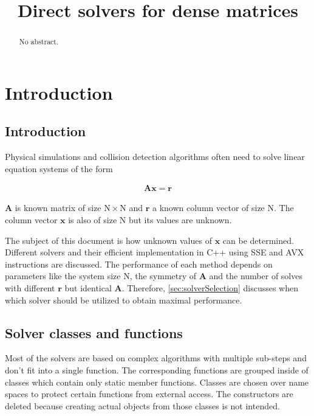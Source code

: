 \documentclass[fontsize = 10pt,DIV = 13]{scrartcl}
\title{Direct solvers for dense matrices}
\begin{document}
\maketitle

\begin{abstract}
No abstract.
\end{abstract}
\newpage
\tableofcontents
\newpage

\section{Introduction}

\subsection{Introduction}
Physical simulations and collision detection algorithms often need to solve linear equation systems of the form

\begin{align}
\label{eq:linearSystem}
\mathbf{A}\mathbf{x}=\mathbf{r}
\end{align}

$\mathbf{A}$ is known matrix of size $\mathrm{N}\times\mathrm{N}$ and $\mathbf{r}$ a known column vector of size $\mathrm{N}$.
The column vector $\mathbf{x}$ is also of size $\mathrm{N}$ but its values are unknown.

 


The subject of this document is how  unknown values of $\mathbf{x}$ can be determined. 
Different solvers and their efficient implementation in C++ using SSE and AVX instructions are discussed.
The performance of each method depends on parameters like the system size $\mathrm{N}$, the symmetry of $\mathbf{A}$ and the number of solves with different $\mathbf{r}$ but identical $\mathbf{A}$.
Therefore, \cref{sec:solverSelection} discusses when which solver should be utilized to obtain maximal performance.


\subsection{Solver classes and functions}

Most of the solvers are based on complex algorithms with multiple sub-steps and don't fit into a single function.
The corresponding functions are grouped inside of classes which contain only static member functions.
Classes are chosen over name spaces to protect certain functions from external access.
The constructors are deleted because creating actual objects from those classes is not intended.
\end{document}
